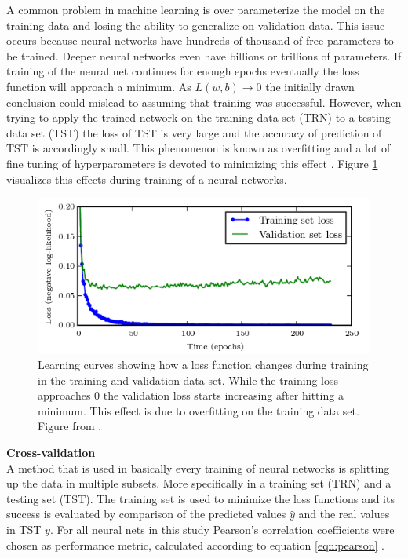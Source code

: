 A common problem in machine learning is over parameterize the model on the training data
and losing the ability to generalize on validation data. This issue occurs because neural
networks have hundreds of thousand of free parameters to be trained. Deeper neural
networks even have billions or trillions of parameters. If training of the neural net
continues for enough epochs eventually the loss function will approach a minimum. As
$ L(w,b) \rightarrow 0 $ the initially drawn conclusion could mislead to assuming that
training was successful. However, when trying to apply the trained network on the training
data set (TRN) to a testing data set (TST) the loss of TST is very large and the accuracy
of prediction of TST is accordingly small. This phenomenon is known as overfitting and a
lot of fine tuning of hyperparameters is devoted to minimizing this effect
\cite{tetko1995neural}. Figure \ref{fig:overfitting} visualizes this effects during
training \cite{goodfellow2016deep} of a neural networks.

\begin{figure}[H]
  \centering \includegraphics[height=.35\textheight, width=1.0\textwidth]{Figures/overfitting}
  \decoRule
  \caption[Training vs. validation loss over time]{Learning curves showing how a loss function
    changes during training in the training and validation data set. While the training loss
    approaches 0 the validation loss starts increasing after hitting a minimum. This effect is due
    to overfitting on the training data set. Figure from \cite{goodfellow2016deep}.}
 \label{fig:overfitting}
\end{figure}

\textbf{Cross-validation} \\

A method that is used in basically every training of neural networks is splitting up the
data in multiple subsets. More specifically in a training set (TRN) and a testing set
(TST). The training set is used to minimize the loss functions and its success is
evaluated by comparison of the predicted values $\hat{y}$ and the real
values in TST $y$. For all neural nets in this study Pearson's correlation coefficients
were chosen as performance metric, calculated according to equation \ref{eqn:pearson}
\cite{soper1917distribution}.

